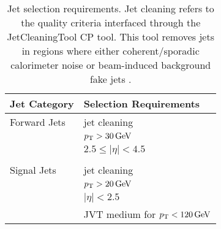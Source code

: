 \begin{table}
  \centering
  \begin{tabular}{l l}
    \toprule
   Jet Category & Selection Requirements \\
    \midrule
    Forward Jets & jet cleaning \\
    & $p_{\mathrm{T}} > 30\,\mathrm{\\GeV}$ \\
    & $2.5 \leq \left|\eta\right| < 4.5$ \\ 
    &\\
    Signal Jets & jet cleaning \\
    & $p_{\mathrm{T}} > 20\,\mathrm{\\GeV}$ \\
    & $ \left|\eta\right| < 2.5$ \\ 
    & JVT medium for $p_{\mathrm{T}} < 120\,\mathrm{\\GeV}$ \\
    \bottomrule
  \end{tabular}
  \caption{Jet selection requirements. Jet cleaning refers to the quality
    criteria interfaced through the JetCleaningTool CP tool. This tool removes
    jets in regions where either coherent/sporadic calorimeter noise or
    beam-induced background fake jets
    \cite{ATLAS-CONF-2015-029,Gonski:2272136}.}
  
  \label{tab:jet-cats}
\end{table}